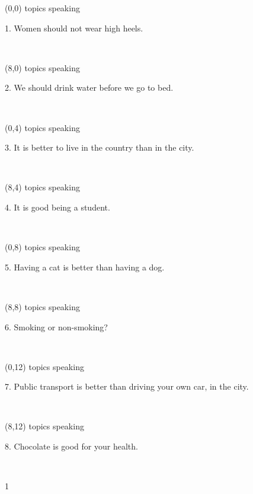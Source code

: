\documentclass[a4paper]{article}
\newcommand{\mycard}[5]{%
	\vspace{0.1cm}
	\small #1 #2
	\par
	\parbox[t][6.7cm][c]{9.5cm}{%
	\hspace{0.1cm} \Large#3\\
	\normalsize#4 #5
	}
}
\begin{document}
\selectfont

\begin{textblock}{8}(0,0)
\mycard{topics}{speaking}{\parbox{9.0cm}{
1. Women should not wear high heels.
}}{}{} 
\end{textblock}

\begin{textblock}{8}(8,0)
\mycard{topics}{speaking}{\parbox{9.0cm}{
2. We should drink water before we go to bed.
}}{}{} 
\end{textblock}

\begin{textblock}{8}(0,4)
\mycard{topics}{speaking}{\parbox{9.0cm}{
3. It is better to live in the country than in the city.
}}{}{} 
\end{textblock}

\begin{textblock}{8}(8,4)
\mycard{topics}{speaking}{\parbox{9.0cm}{
4. It is good being a student.
}}{}{} 
\end{textblock}

\begin{textblock}{8}(0,8)
\mycard{topics}{speaking}{\parbox{9.0cm}{
5. Having a cat is better than having a dog.
}}{}{} 
\end{textblock}

\begin{textblock}{8}(8,8)
\mycard{topics}{speaking}{\parbox{9.0cm}{
6. Smoking or non-smoking?
}}{}{} 
\end{textblock}

\begin{textblock}{8}(0,12)
\mycard{topics}{speaking}{\parbox{9.0cm}{
7. Public transport is better than driving your own car, in the city.
}}{}{} 
\end{textblock}

\begin{textblock}{8}(8,12)
\mycard{topics}{speaking}{\parbox{9.0cm}{
8. Chocolate is good for your health.
}}{}{} 
\end{textblock}

\begin{tiny}1\end{tiny}\\
\newpage
\end{document}

